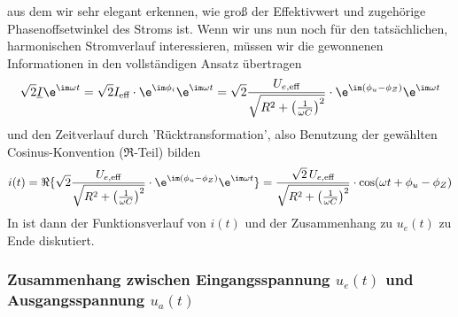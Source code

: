 aus dem wir sehr elegant erkennen, wie groß der Effektivwert und zugehörige
Phasenoffsetwinkel des Stroms ist.
%
Wenn wir uns nun noch für den tatsächlichen, harmonischen Stromverlauf
interessieren, müssen wir
die gewonnenen Informationen in den vollständigen Ansatz übertragen
\begin{align}
\sqrt{2} \underline{I} \e^{\im \omega t}=
\sqrt{2}  I_\text{eff} \cdot \e^{\im \phi_i} \e^{\im \omega t} =
\sqrt{2} \frac{U_{e,\text{eff}}}{\sqrt{R^2 +  \left(\frac{1}{\omega C}\right)^2}}
\cdot \e^{\im (\phi_u-\phi_Z)} \e^{\im \omega t}
\end{align}
und den Zeitverlauf durch 'Rücktransformation', also Benutzung der
gewählten Cosinus-Konvention ($\Re$-Teil) bilden
\begin{align}
i(t) =
\Re\{\sqrt{2} \frac{U_{e,\text{eff}}}{\sqrt{R^2 +  \left(\frac{1}{\omega C}\right)^2}}
\cdot \e^{\im (\phi_u-\phi_Z)} \e^{\im \omega t}\}=
\frac{\sqrt{2} \, U_{e,\text{eff}}}{\sqrt{R^2 +  \left(\frac{1}{\omega C}\right)^2}}
\cdot \cos(\omega t + \phi_u-\phi_Z)
\end{align}
%
In \cite[Kap. 9.8.2]{Marinescu2020} ist dann der Funktionsverlauf von $i(t)$
und der Zusammenhang zu $u_e(t)$ zu Ende diskutiert.

\subsubsection*{Zusammenhang zwischen Eingangsspannung $u_e(t)$ und Ausgangsspannung $u_a(t)$}

\cite[Kap. 13.1]{Marinescu2020}

